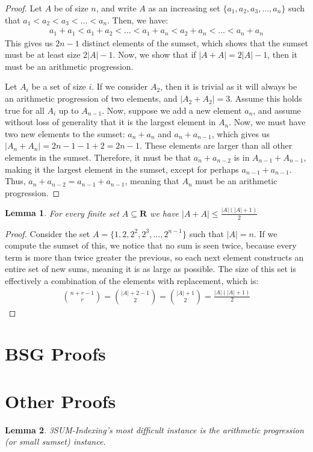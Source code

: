 \documentclass{article}
\newtheorem{lemma}{Lemma}
\begin{document}
\begin{proof}
Let $A$ be of size $n$, and write $A$ as an increasing set $\{a_1, a_2, a_3, ..., a_n\}$ such that $a_1 < a_2 < a_3 < ... < a_n$. Then, we have:
\begin{align*}
    a_1 + a_1 < a_1 + a_2 < ... < a_1 + a_n < a_2 + a_n < ... < a_n + a_n
\end{align*}
This gives us $2n-1$ distinct elements of the sumset, which shows that the sumset must be at least size $2|A|-1$. Now, we show that if $|A+A| = 2|A|-1$, then it must be an arithmetic progression. 

Let $A_i$ be a set of size $i$. If we consider $A_2$, then it is trivial as it will always be an arithmetic progression of two elements, and $|A_2 + A_2| = 3$. Assume this holds true for all $A_i$ up to $A_{n-1}$. Now, suppose we add a new element $a_n$, and assume without loss of generality that it is the largest element in $A_n$. Now, we must have two new elements to the sumset: $a_n + a_n$ and $a_n + a_{n-1}$, which gives us $|A_n + A_n| = 2{n-1}-1 + 2 = 2n-1$. These elements are larger than all other elements in the sumset. Therefore, it must be that $a_n + a_{n-2}$ is in $A_{n-1} + A_{n-1}$, making it the largest element in the sumset, except for perhaps $a_{n-1} + a_{n-1}$. Thus, $a_n + a_{n-2} = a_{n-1} + a_{n-1}$, meaning that $A_{n}$ must be an arithmetic progression.
\end{proof}

\begin{lemma}
\label{Largest sumset}
For every finite set $A \subseteq \mathbf{R}$ we have $|A+A| \leq \frac{|A|(|A| + 1)}{2}$
\end{lemma}

\begin{proof}
Consider the set $A = \{1,2,2^2,2^3,...,2^{n-1}\}$ such that $|A| = n$. If we compute the sumset of this, we notice that no sum is seen twice, because every term is more than twice greater the previous, so each next element constructs an entire set of new sums, meaning it is as large as possible. The size of this set is effectively a combination of the elements with replacement, which is:
\begin{align*}
    \binom{n+r-1}{r} = \binom{|A|+2-1}{2} = \binom{|A|+1}{2} = \frac{|A|(|A| + 1)}{2}
\end{align*}
\end{proof}

\section{BSG Proofs}
\label{sec:bsg}

\section{Other Proofs}
\label{sec:other}

\begin{lemma}
\label{Difficulty of Problem}
3SUM-Indexing's most difficult instance is the arithmetic progression (or small sumset) instance.
\end{lemma}
\end{document}
